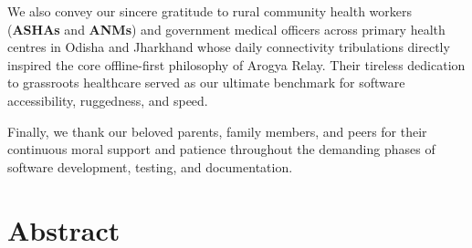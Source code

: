 \documentclass[12pt,a4paper,oneside]{report}
\begin{document}
\vspace{0.4cm}
We also convey our sincere gratitude to rural community health workers (\textbf{ASHAs} and \textbf{ANMs}) and government medical officers across primary health centres in Odisha and Jharkhand whose daily connectivity tribulations directly inspired the core offline-first philosophy of Arogya Relay. Their tireless dedication to grassroots healthcare served as our ultimate benchmark for software accessibility, ruggedness, and speed.

\vspace{0.4cm}
Finally, we thank our beloved parents, family members, and peers for their continuous moral support and patience throughout the demanding phases of software development, testing, and documentation.

\newpage

\chapter*{Abstract}
\end{document}
